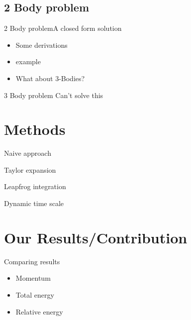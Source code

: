 \documentclass{beamer}
\begin{document}
\subsection{2 Body problem}

\begin{frame}{2 Body problem}{A closed form solution}

  \begin{itemize}
  \item
    Some derivations
  \item
    example
  \item
  	What about 3-Bodies?
  \end{itemize}
\end{frame}

\begin{frame}{3 Body problem}
	Can't solve this
\end{frame}

\section{Methods}

\begin{frame}{Naive approach}
\end{frame}

\begin{frame}{Taylor expansion}
\end{frame}

\begin{frame}{Leapfrog integration}
\end{frame}


\begin{frame}{Dynamic time scale}

\end{frame}

\section{Our Results/Contribution}

\begin{frame}{Comparing results}
 \begin{itemize}
	\item
		Momentum
	\item
		Total energy
	\item 
		Relative energy
 \end{itemize}
\end{frame}
\end{document}
